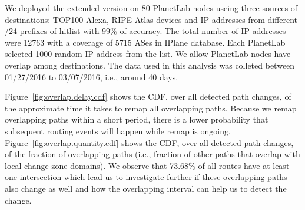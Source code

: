 We deployed the extended \dtrack{} version on 80 PlanetLab nodes useing three 
sources of destinations: TOP100 Alexa,  RIPE Atlas devices and IP addresses from 
different /24 prefixes of  hitlist with 99\% of accuracy. The total number of IP 
addresses were 12763 with a coverage of 5715 ASes in IPlane database. Each PlanetLab selected
1000 random IP address from the list. We allow PlanetLab nodes have overlap
among destinations. The data used in this analysis was colleted between 01/27/2016 
to 03/07/2016, i.e., around 40 days.

Figure~\ref{fig:overlap.delay.cdf} shows the CDF, over all detected
path changes, of the approximate time it takes to remap all
overlapping paths.  Because we remap overlapping paths within
a short period, there is a lower probability that subsequent routing
events will happen while remap is ongoing. 
Figure~\ref{fig:overlap.quantity.cdf} shows the CDF, over all
detected path changes, of the fraction of overlapping paths (i.e.,
fraction of other paths that overlap with local change zone
domains).  We observe that 73.68\% of all routes have at least one 
intersection which lead us to investigate further if these
overlapping paths also change as well and how the overlapping
interval can help us to detect the change.

